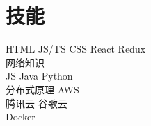 \documentclass[]{deedy-resume-openfont}
\begin{document}
\begin{minipage}[t]{0.25\textwidth}


\section{技能}
\sectionsep

HTML \textbullet{}JS/TS \textbullet{} CSS \textbullet{} React \textbullet{} Redux \textbullet{}  \\
网络知识 \\
\sectionsep
{}
JS \textbullet{} Java \textbullet{} Python \\
\sectionsep
{}
分布式原理 \textbullet{} AWS \\ 腾讯云 \textbullet{} 谷歌云 \textbullet  \\ Docker

\sectionsep

%
%

\end{minipage} 
\hfill
\end{document}

